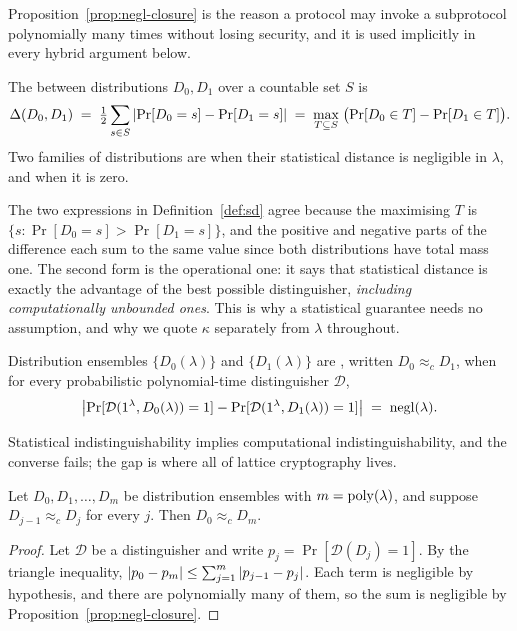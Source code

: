 Proposition~\ref{prop:negl-closure} is the reason a protocol may invoke a
subprotocol polynomially many times without losing security, and it is used
implicitly in every hybrid argument below.

\begin{definition}
\label{def:sd}
The  between distributions $D_0,D_1$ over a countable
set $S$ is
\[
  \Delta(D_0,D_1) \;=\; \tfrac{1}{2}\sum_{s \in S}\left\lvert \Pr[D_0 = s] - \Pr[D_1 = s] \right\rvert
  \;=\; \max_{T \subseteq S}\;\bigl(\Pr[D_0 \in T] - \Pr[D_1 \in T]\bigr).
\]
Two families of distributions are  when their
statistical distance is negligible in $\lambda$, and  when it is zero.
\end{definition}

The two expressions in Definition~\ref{def:sd} agree because the maximising $T$
is $\{s : \Pr[D_0=s] > \Pr[D_1=s]\}$, and the positive and negative parts of the
difference each sum to the same value since both distributions have total mass
one. The second form is the operational one: it says that statistical distance is
exactly the advantage of the best possible distinguisher, \emph{including
computationally unbounded ones}. This is why a statistical guarantee needs no
assumption, and why we quote $\kappa$ separately from $\lambda$ throughout.

\begin{definition}
\label{def:ci}
Distribution ensembles $\{D_0(\lambda)\}$ and $\{D_1(\lambda)\}$ are
, written $D_0 \approx_c D_1$, when for
every probabilistic polynomial-time distinguisher $\mathcal{D}$,
\[
  \left\lvert \Pr[\mathcal{D}(1^\lambda, D_0(\lambda)) = 1] -
       \Pr[\mathcal{D}(1^\lambda, D_1(\lambda)) = 1] \right\rvert \;=\; \mathrm{negl}(\lambda).
\]
\end{definition}

Statistical indistinguishability implies computational indistinguishability, and
the converse fails; the gap is where all of lattice cryptography lives.

\begin{lemma}
\label{lem:hybrid}
Let $D_0,D_1,\dots,D_m$ be distribution ensembles with $m = \mathrm{poly}(\lambda)$, and
suppose $D_{j-1} \approx_c D_j$ for every $j$. Then $D_0 \approx_c D_m$.
\end{lemma}

\begin{proof}
Let $\mathcal{D}$ be a distinguisher and write
$p_j = \Pr[\mathcal{D}(D_j)=1]$. By the triangle inequality,
$\left\lvert p_0 - p_m \right\rvert \le \sum_{j=1}^{m}\left\lvert p_{j-1}-p_j \right\rvert$. Each term is negligible by
hypothesis, and there are polynomially many of them, so the sum is negligible by
Proposition~\ref{prop:negl-closure}.
\end{proof}


